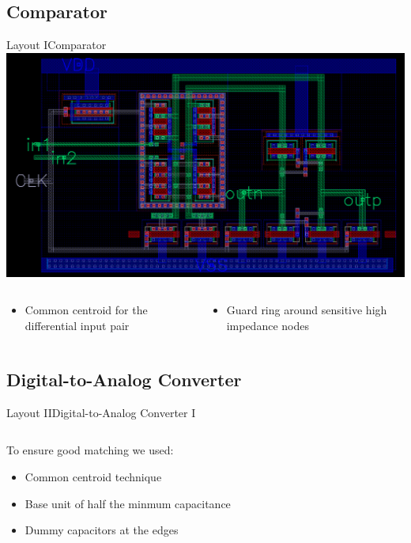 \documentclass{beamer}
\begin{document}
 \subsection{Comparator}
 \begin{frame}{Layout I}{Comparator}
  \includegraphics[width=\textwidth]{img/comparator_layout}

  \begin{columns}
   \begin{column}{0.5\textwidth}
    \begin{itemize}
     \item Common centroid for the differential input pair
    \end{itemize}
   \end{column}
   \begin{column}{0.5\textwidth}
    \begin{itemize}
     \item<2-> Guard ring around sensitive high impedance nodes
    \end{itemize}
   \end{column}
  \end{columns}
 \end{frame}
 
 \subsection{Digital-to-Analog Converter}
 \begin{frame}{Layout II}{Digital-to-Analog Converter I}
    \begin{columns}
    \begin{column}{0.40\linewidth}
    To ensure good matching we used: 
    \begin{itemize}
        \item Common centroid technique
        \item<2-> Base unit of half the minmum capacitance
        \item<3-> Dummy capacitors at the edges
    \end{itemize}
    \vspace{3em}
    \end{column}
    \begin{column}{0.60\linewidth}
        \centering
        
    \end{column}
    \end{columns}
 \end{frame}
 
\end{document}
